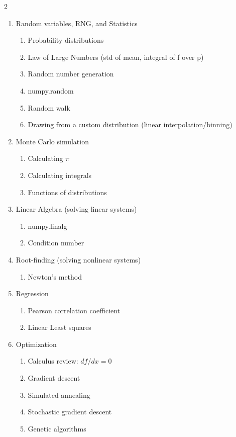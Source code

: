 \documentclass{article}
\begin{document}
\begin{multicols}{2}
\begin{enumerate}
\begin{enumerate}
		\item Integer division
		\item Error
	\end{enumerate}
	\item Random variables, RNG, and Statistics
	\begin{enumerate}
		\item Probability distributions
		\item Law of Large Numbers (std of mean, integral of f over p)
		\item Random number generation
		\item numpy.random
		\item Random walk
		\item Drawing from a custom distribution (linear interpolation/binning)
	\end{enumerate}
	\item Monte Carlo simulation
	\begin{enumerate}
		\item Calculating $\pi$
		\item Calculating integrals
		\item Functions of distributions
	\end{enumerate}
	\item Linear Algebra (solving linear systems)
	\begin{enumerate}
		\item numpy.linalg
		\item Condition number
	\end{enumerate}
	\item Root-finding (solving nonlinear systems)
	\begin{enumerate}
		\item Newton's method
	\end{enumerate}
	\item Regression
	\begin{enumerate}
		\item Pearson correlation coefficient
		\item Linear Least squares
	\end{enumerate}
	\item Optimization
	\begin{enumerate}
		\item Calculus review: $df/dx=0$
		\item Gradient descent
		\item Simulated annealing
		\item Stochastic gradient descent
		\item Genetic algorithms

\end{enumerate}
\end{enumerate}
\end{multicols}
\end{document}
